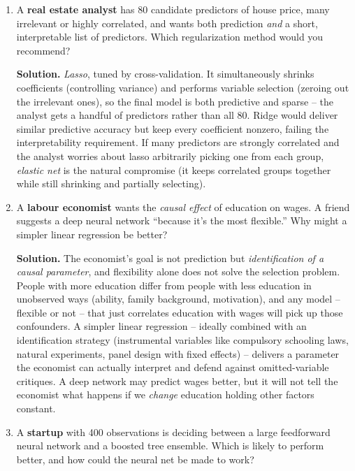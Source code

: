 \documentclass[11pt]{article}
\newcommand{\solution}[1]{%
  \par\medskip\noindent\textbf{Solution.} #1\par\medskip
}
\begin{document}
\begin{enumerate}[leftmargin=*]
\item A \textbf{real estate analyst} has 80 candidate predictors of house price, many irrelevant or highly correlated, and wants both prediction \emph{and} a short, interpretable list of predictors. Which regularization method would you recommend?

\solution{\emph{Lasso}, tuned by cross-validation. It simultaneously shrinks coefficients (controlling variance) and performs variable selection (zeroing out the irrelevant ones), so the final model is both predictive and sparse -- the analyst gets a handful of predictors rather than all 80. Ridge would deliver similar predictive accuracy but keep every coefficient nonzero, failing the interpretability requirement. If many predictors are strongly correlated and the analyst worries about lasso arbitrarily picking one from each group, \emph{elastic net} is the natural compromise (it keeps correlated groups together while still shrinking and partially selecting).}

\item A \textbf{labour economist} wants the \emph{causal effect} of education on wages. A friend suggests a deep neural network ``because it's the most flexible.'' Why might a simpler linear regression be better?

\solution{The economist's goal is not prediction but \emph{identification of a causal parameter}, and flexibility alone does not solve the selection problem. People with more education differ from people with less education in unobserved ways (ability, family background, motivation), and any model -- flexible or not -- that just correlates education with wages will pick up those confounders. A simpler linear regression -- ideally combined with an identification strategy (instrumental variables like compulsory schooling laws, natural experiments, panel design with fixed effects) -- delivers a parameter the economist can actually interpret and defend against omitted-variable critiques. A deep network may predict wages better, but it will not tell the economist what happens if we \emph{change} education holding other factors constant.}

\item A \textbf{startup} with 400 observations is deciding between a large feedforward neural network and a boosted tree ensemble. Which is likely to perform better, and how could the neural net be made to work?


\end{enumerate}
\end{document}
